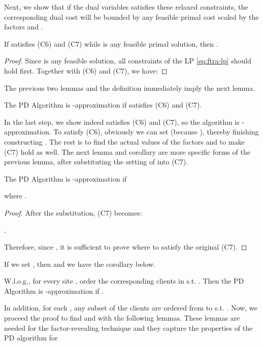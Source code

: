 \documentclass[10pt]{llncs}
\begin{document}
Next, we show that if the dual variables 
satisfies these relaxed constraints, the corresponding dual cost will
be bounded by any feasible primal cost scaled by the factors 
and .
\begin{lemma}
If 
satisfies (C6) and (C7) while 
is any feasible primal solution, then .\label{lem:dual-bound}\end{lemma}
\begin{proof}
Since  is any feasible
solution, all constraints of the LP \eqref{eq:ftra-lp} should hold
first. Together with (C6) and (C7), we have:

{\small 

}{\small \par}
\end{proof}
The previous two lemmas and the definition immediately imply the next
lemma.
\begin{lemma}
The PD Algorithm is -approximation
if 
satisfies (C6) and (C7).\label{lem:appro}
\end{lemma}
In the last step, we show 
indeed satisfies (C6) and (C7), so the algorithm is -approximation.
To satisfy (C6), obviously we can set 
(because ), thereby finishing constructing .
The rest is to find the actual values of the factors  and
 to make (C7) hold as well. The next lemma and corollary
are more specific forms of the previous lemma, after substituting
the setting of 
into (C7).
\begin{lemma}
The PD Algorithm is -approximation
if \linebreak{}

where .\label{lem:s-appro}\end{lemma}
\begin{proof}
After the substitution, (C7) becomes:





.

Therefore, since , it is sufficient to prove 
where 
to satisfy the original (C7).
\end{proof}
If we set ,
then  and we have the corollary below.
\begin{corollary}
W.l.o.g., for every site , order the corresponding 
clients in 
s.t. . Then the PD Algorithm is
-approximation if .
\label{cor:s-appro}
\end{corollary}
In addition, for each , any subset of the clients are ordered
from  to  s.t. . Now,
we proceed the proof to find  and  with the
following lemmas. These lemmas are needed for the factor-revealing
technique and they capture the properties of the PD algorithm for
\end{document}
